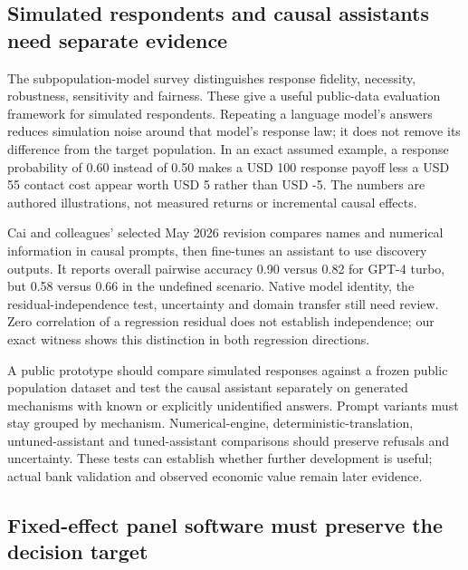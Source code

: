 \hypertarget{simulated-respondents-and-causal-assistants-need-separate-evidence}{%
\subsection{Simulated respondents and causal assistants need separate
evidence}\label{simulated-respondents-and-causal-assistants-need-separate-evidence}}

The subpopulation-model survey distinguishes response fidelity,
necessity, robustness, sensitivity and fairness. These give a useful
public-data evaluation framework for simulated respondents. Repeating a
language model's answers reduces simulation noise around that model's
response law; it does not remove its difference from the target
population. In an exact assumed example, a response probability of 0.60
instead of 0.50 makes a USD 100 response payoff less a USD 55 contact
cost appear worth USD 5 rather than USD -5. The numbers are authored
illustrations, not measured returns or incremental causal effects.
\citep{exec20_population,exec20_population_attribution_reference}

Cai and colleagues' selected May 2026 revision compares names and
numerical information in causal prompts, then fine-tunes an assistant to
use discovery outputs. It reports overall pairwise accuracy 0.90 versus
0.82 for GPT-4 turbo, but 0.58 versus 0.66 in the undefined scenario.
Native model identity, the residual-independence test, uncertainty and
domain transfer still need review. Zero correlation of a regression
residual does not establish independence; our exact witness shows this
distinction in both regression directions.
\citep{exec20_attribution,exec20_population_attribution_reference}

A public prototype should compare simulated responses against a frozen
public population dataset and test the causal assistant separately on
generated mechanisms with known or explicitly unidentified answers.
Prompt variants must stay grouped by mechanism. Numerical-engine,
deterministic-translation, untuned-assistant and tuned-assistant
comparisons should preserve refusals and uncertainty. These tests can
establish whether further development is useful; actual bank validation
and observed economic value remain later evidence.

\hypertarget{fixed-effect-panel-software-must-preserve-the-decision-target}{%
\subsection{Fixed-effect panel software must preserve the decision
target}\label{fixed-effect-panel-software-must-preserve-the-decision-target}}

